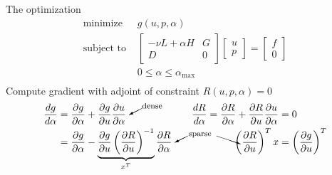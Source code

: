 \documentclass[12pt,t]{beamer}
\begin{document}
\begin{frame}
 The optimization
\begin{align*}
      \text{minimize } & g(u,p,\alpha) \\
      \text{subject to } & \begin{bmatrix} -\nu L + \alpha H & G \\
        D & 0 \end{bmatrix} \begin{bmatrix} u \\ p \end{bmatrix}
      = \begin{bmatrix} f \\ 0 \end{bmatrix} \\
      & 0 \le \alpha \le \alpha_{\text{max}}\\
\end{align*}
Compute gradient with adjoint of constraint $R(u,p,\alpha) = 0$
\begin{align*}
      \frac{d g}{d \alpha} &= \frac{\partial g}{\partial \alpha}
      + \frac{\partial g}{\partial u} \frac{\partial u}{\partial \alpha}   
         \begin{picture}(10,5)\put(16,9){\vector(-2,-1){13}} \put(16,9){\footnotesize{dense}} \end{picture}
      &
      \frac{d R}{d \alpha} = \frac{\partial R}{\partial \alpha}
      + \frac{\partial R}{\partial u} \frac{\partial u}{\partial \alpha}
      &= 0 \\
      &= \frac{\partial g}{\partial \alpha}
      - \underbrace{\frac{\partial g}{\partial u}
      \left(\frac{\partial R}{\partial u}\right)^{-1}}_{x^T}
      \frac{\partial R}{\partial \alpha} 
      \begin{picture}(10,5)\put(16,9){\vector(-2,-1){13}} \put(17,9){\footnotesize{sparse}}  \put(45,9){\vector(3,-1){24}}\end{picture}
      &
      \left( \frac{\partial R}{\partial u} \right)^T x
      &= \left(\frac{\partial g}{\partial u} \right)^T
\end{align*}

\end{frame}
\end{document}
